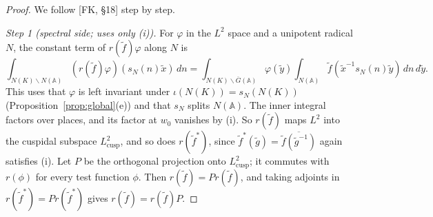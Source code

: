 \documentclass[12pt]{article}
\newcommand{\ov}[1]{\overline{#1}}
\newcommand{\A}{\mathbb{A}}
\newcommand{\Gb}{\ov{G}}
\theoremstyle{plain}
\theoremstyle{definition}
\begin{document}
\begin{proof}
We follow [FK, \S18] step by step.

\emph{Step 1 (spectral side; uses only (i)).} For $\varphi$ in the $L^2$ space and a unipotent radical $N$, the constant term of $r(\tilde f)\varphi$ along $N$ is
\[ \int_{N(K)\backslash N(\A)}(r(\tilde f)\varphi)(s_N(n)\tilde x)\,dn=\int_{N(K)\backslash\Gb(\A)}\varphi(\tilde y)\int_{N(\A)}\tilde f(\tilde x^{-1}s_N(n)\tilde y)\,dn\,d\tilde y. \]
This uses that $\varphi$ is left invariant under $\iota(N(K))=s_N(N(K))$ (Proposition~\ref{prop:global}(e)) and that $s_N$ splits $N(\A)$. The inner integral factors over places, and its factor at $w_0$ vanishes by (i). So $r(\tilde f)$ maps $L^2$ into the cuspidal subspace $L^2_{\mathrm{cusp}}$, and so does $r(\tilde f^*)$, since $\tilde f^*(\tilde g)=\ov{\tilde f(\tilde g^{-1})}$ again satisfies (i). Let $P$ be the orthogonal projection onto $L^2_{\mathrm{cusp}}$; it commutes with $r(\phi)$ for every test function $\phi$. Then $r(\tilde f)=Pr(\tilde f)$, and taking adjoints in $r(\tilde f^*)=Pr(\tilde f^*)$ gives $r(\tilde f)=r(\tilde f)P$.


\end{proof}
\end{document}
